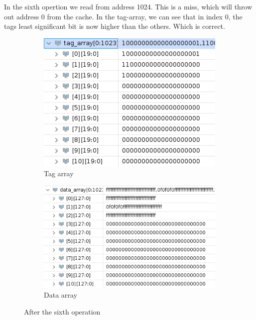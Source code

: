 \documentclass{article}
\begin{document}
In the sixth opertion we read from address 1024. This is a miss, which will throw out address 0 from the cache. In the tag-array, we can see that in index 0, the tags least significant bit is now higher than the others. Which is correct.
\begin{figure}[H]
\centering
\begin{subfigure}{.5\textwidth}
  \centering
  \includegraphics[width=.8\linewidth]{img/tag4.png}
  \caption{Tag array}
\end{subfigure}%
\begin{subfigure}{.5\textwidth}
  \centering
  \includegraphics[width=.9\linewidth]{img/data4.png}
  \caption{Data array}
\end{subfigure}
\caption{After the sixth operation}
\end{figure}
\end{document}
